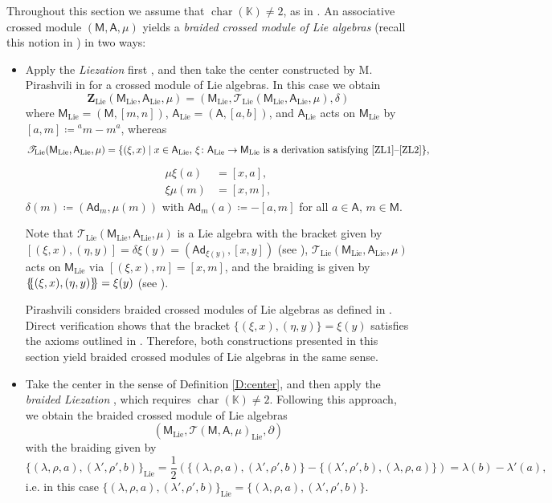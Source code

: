\documentclass[12pt,reqno]{amsart}
\theoremstyle{plain}
\theoremstyle{definition}
\theoremstyle{remark}
\newcommand{\K}{\ensuremath{\mathbb{K}}}
\newcommand{\A}{\ensuremath{\mathsf{A}}}
\newcommand*{\ldblbrace}{\{\mskip-5mu\{}
\newcommand*{\rdblbrace}{\}\mskip-5mu\}}
\newcommand{\MM}{\ensuremath{\mathsf{M}}}
\newcommand{\ZC}{\ensuremath{\mathbf{Z}}}
\newcommand{\T}{\ensuremath{\mathcal{T}}}
\newcommand{\Ad}{\ensuremath{\mathsf{Ad}}}
\numberwithin{equation}{section}
\begin{document}
Throughout this section we assume that $\operatorname{char}(\K)\neq 2$, as in \cite{Pim2}. An associative crossed module $(\MM,\A,\mu)$ yields a \emph{braided crossed module of Lie algebras} (recall this notion in \cite[Definition 4.4]{FFL1}) in two ways:
	\begin{itemize}
		\item[(i)] Apply the \emph{Liezation} first \cite[Lemma 1.1]{FFL1}, and then take the center constructed by M. Pirashvili in \cite[Proposition 3.2]{Pim2} for a crossed module of Lie algebras. In this case we obtain
		\[\ZC_{\text{Lie}}(\MM_{\text{Lie}},\A_{\text{Lie}},\mu)=(\MM_{\text{Lie}},\T_{\text{Lie}}(\MM_{\text{Lie}},\A_{\text{Lie}},\mu),\delta)\]
		where
		$\MM_{\text{Lie}}=(\MM,[m,n])$, $\A_{\text{Lie}}=(\A,[a,b])$, and $\A_{\text{Lie}}$ acts on $\MM_{\text{Lie}}$ by $[a,m]\coloneqq{}^am-m^a$, whereas
		\[\T_{\text{Lie}}(\MM_{\text{Lie}},\A_{\text{Lie}},\mu)=\{(\xi,x)\mid x\in \A_{\text{Lie}},\,\xi\colon \A_{\text{Lie}}\to \MM_{\text{Lie}} \text{ is a derivation satisfying }\eqref{ZL1}\text{--}\eqref{ZL2}\},\]
		\begin{align}
			\mu\xi(a)&=[x,a],\tag{ZL1}\label{ZL1}\\
			\xi\mu(m)&=[x,m],\tag{ZL2}\label{ZL2}		
		\end{align}
		$\delta(m)\coloneqq(\Ad_{m},\mu(m))$ with $\Ad_{m}(a)\coloneqq- [a,m]$ for all $a\in\A,\,m\in \MM$.
		
		Note  that $\T_{\text{Lie}}(\MM_{\text{Lie}},\A_{\text{Lie}},\mu)$ is a Lie algebra with the bracket given by $[(\xi,x),(\eta,y)]=\delta\xi(y)=(\Ad_{\xi(y)},[x,y])$ (see \cite[Corollary~3.4]{Pim2}),  $\T_{\text{Lie}}(\MM_{\text{Lie}},\A_{\text{Lie}},\mu)$ acts on $\MM_{\text{Lie}}$ via $[(\xi,x),m]=[x,m]$,
		 and the braiding is given by
		$\ldblbrace(\xi,x),(\eta,y)\rdblbrace=\xi(y)$ (see \cite[Proposition~3.2]{Pim2}).

	Pirashvili considers braided crossed modules of Lie algebras as defined in \cite[Proposition~6.20]{CC}. Direct verification shows that the bracket
	 $\{(\xi,x),(\eta,y)\}=\xi(y)$ satisfies the axioms outlined in \cite[Definition~4.4]{FFL1}. Therefore, both constructions presented in this section yield braided crossed modules of Lie algebras in the same sense.	


		\item[(ii)] Take the center in the sense of Definition \ref{D:center}, and then apply the \emph{braided Liezation} \cite[Proposition 4.3]{FFL1}, which requires $\operatorname{char}(\K)\neq 2$. Following this approach, we obtain the braided crossed module of Lie algebras
		\[(\MM_{\text{Lie}},\T(\MM,\A,\mu)_{\text{Lie}},\partial)\]
		with the braiding given by
		\[\{(\lambda,\rho,a),(\lambda',\rho',b)\}_{\text{Lie}}=\frac{1}{2}(\{(\lambda,\rho,a),(\lambda',\rho',b)\}-\{(\lambda',\rho',b),(\lambda,\rho,a)\})=\lambda(b)-\lambda'(a),\]
		i.e. in this case $\{(\lambda,\rho,a),(\lambda',\rho',b)\}_{\text{Lie}}=\{(\lambda,\rho,a),(\lambda',\rho',b)\}$.
	\end{itemize}
	
\end{document}
